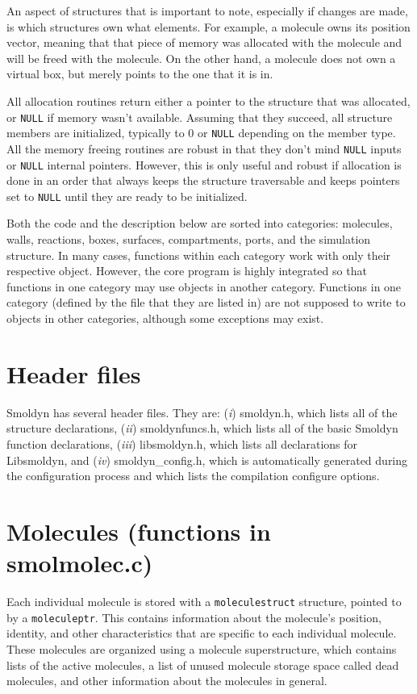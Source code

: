\documentclass {book}
\newcommand {\ttt} {\texttt}
\begin{document}
An aspect of structures that is important to note, especially if changes are made, is which structures own what elements. For example, a molecule owns its position vector, meaning that that piece of memory was allocated with the molecule and will be freed with the molecule. On the other hand, a molecule does not own a virtual box, but merely points to the one that it is in.

All allocation routines return either a pointer to the structure that was allocated, or \ttt{NULL} if memory wasn't available. Assuming that they succeed, all structure members are initialized, typically to 0 or \ttt{NULL} depending on the member type. All the memory freeing routines are robust in that they don't mind \ttt{NULL} inputs or \ttt{NULL} internal pointers. However, this is only useful and robust if allocation is done in an order that always keeps the structure traversable and keeps pointers set to \ttt{NULL} until they are ready to be initialized.

Both the code and the description below are sorted into categories: molecules, walls, reactions, boxes, surfaces, compartments, ports, and the simulation structure. In many cases, functions within each category work with only their respective object. However, the core program is highly integrated so that functions in one category may use objects in another category. Functions in one category (defined by the file that they are listed in) are not supposed to write to objects in other categories, although some exceptions may exist.

\section{Header files}

Smoldyn has several header files. They are: (\emph{i}) smoldyn.h, which lists all of the structure declarations, (\emph{ii}) smoldynfuncs.h, which lists all of the basic Smoldyn function declarations, (\emph{iii}) libsmoldyn.h, which lists all declarations for Libsmoldyn, and (\emph{iv}) smoldyn\_config.h, which is automatically generated during the configuration process and which lists the compilation configure options.

\section{Molecules (functions in smolmolec.c)}

Each individual molecule is stored with a \ttt{moleculestruct} structure, pointed to by a \ttt{moleculeptr}. This contains information about the molecule's position, identity, and other characteristics that are specific to each individual molecule. These molecules are organized using a molecule superstructure, which contains lists of the active molecules, a list of unused molecule storage space called dead molecules, and other information about the molecules in general.
\end{document}
